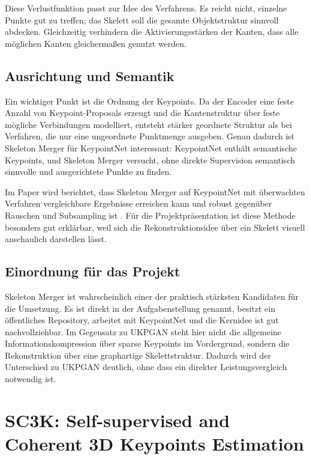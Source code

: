 \documentclass[11pt,a4paper]{article}
\begin{document}
Diese Verlustfunktion passt zur Idee des Verfahrens. Es reicht nicht, einzelne Punkte gut zu treffen; das Skelett soll die gesamte Objektstruktur sinnvoll abdecken. Gleichzeitig verhindern die Aktivierungsstärken der Kanten, dass alle möglichen Kanten gleichermaßen genutzt werden.

\subsection{Ausrichtung und Semantik}

Ein wichtiger Punkt ist die Ordnung der Keypoints. Da der Encoder eine feste Anzahl von Keypoint-Proposals erzeugt und die Kantenstruktur über feste mögliche Verbindungen modelliert, entsteht stärker geordnete Struktur als bei Verfahren, die nur eine ungeordnete Punktmenge ausgeben. Genau dadurch ist Skeleton Merger für KeypointNet interessant: KeypointNet enthält semantische Keypoints, und Skeleton Merger versucht, ohne direkte Supervision semantisch sinnvolle und ausgerichtete Punkte zu finden.

Im Paper wird berichtet, dass Skeleton Merger auf KeypointNet mit überwachten Verfahren vergleichbare Ergebnisse erreichen kann und robust gegenüber Rauschen und Subsampling ist \cite{shi2021skeletonmerger}. Für die Projektpräsentation ist diese Methode besonders gut erklärbar, weil sich die Rekonstruktionsidee über ein Skelett visuell anschaulich darstellen lässt.

\subsection{Einordnung für das Projekt}

Skeleton Merger ist wahrscheinlich einer der praktisch stärksten Kandidaten für die Umsetzung. Es ist direkt in der Aufgabenstellung genannt, besitzt ein öffentliches Repository, arbeitet mit KeypointNet und die Kernidee ist gut nachvollziehbar. Im Gegensatz zu UKPGAN steht hier nicht die allgemeine Informationskompression über sparse Keypoints im Vordergrund, sondern die Rekonstruktion über eine graphartige Skelettstruktur. Dadurch wird der Unterschied zu UKPGAN deutlich, ohne dass ein direkter Leistungsvergleich notwendig ist.

\section{SC3K: Self-supervised and Coherent 3D Keypoints Estimation}
\end{document}
